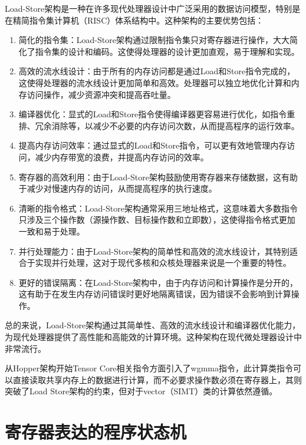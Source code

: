 Load-Store架构是一种在许多现代处理器设计中广泛采用的数据访问模型，特别是在精简指令集计算机（RISC）体系结构中。这种架构的主要优势包括：

\begin{enumerate}
\item 简化的指令集：Load-Store架构通过限制指令集只对寄存器进行操作，大大简化了指令集的设计和编码。这使得处理器的设计更加直观，易于理解和实现。

\item 高效的流水线设计：由于所有的内存访问都是通过Load和Store指令完成的，这使得处理器的流水线设计更加简单和高效。处理器可以独立地优化计算和内存访问操作，减少资源冲突和提高吞吐量。

\item 编译器优化：显式的Load和Store指令使得编译器更容易进行优化，如指令重排、冗余消除等，以减少不必要的内存访问次数，从而提高程序的运行效率。

\item 提高内存访问效率：通过显式的Load和Store指令，可以更有效地管理内存访问，减少内存带宽的浪费，并提高内存访问的效率。

\item 寄存器的高效利用：由于Load-Store架构鼓励使用寄存器来存储数据，这有助于减少对慢速内存的访问，从而提高程序的执行速度。

\item 清晰的指令格式：Load-Store架构通常采用三地址格式，这意味着大多数指令只涉及三个操作数（源操作数、目标操作数和立即数），这使得指令格式更加一致和易于处理。

\item 并行处理能力：由于Load-Store架构的简单性和高效的流水线设计，其特别适合于实现并行处理，这对于现代多核和众核处理器来说是一个重要的特性。

\item 更好的错误隔离：在Load-Store架构中，由于内存访问和计算操作是分开的，这有助于在发生内存访问错误时更好地隔离错误，因为错误不会影响到计算操作。
\end{enumerate}

总的来说，Load-Store架构通过其简单性、高效的流水线设计和编译器优化能力，为现代处理器提供了高性能和高能效的计算环境。这种架构在现代微处理器设计中非常流行。

从Hopper架构开始Tensor Core相关指令方面引入了wgmma指令，此计算类指令可以直接读取共享内存上的数据进行计算，而不必要求操作数必须在寄存器上，其则突破了Load Store架构的约束，但对于vector（SIMT）类的计算依然遵循。

\section{寄存器表达的程序状态机}


